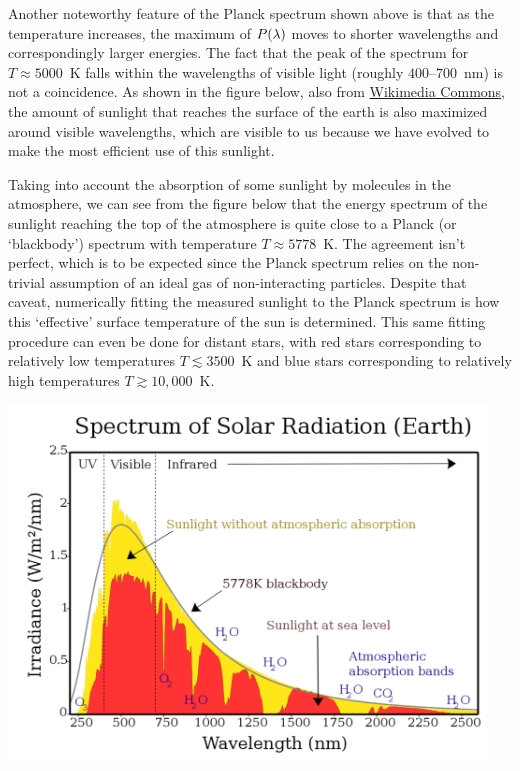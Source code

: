 Another noteworthy feature of the Planck spectrum shown above is that as the temperature increases, the maximum of $P(\lambda)$ moves to shorter wavelengths and correspondingly larger energies.
The fact that the peak of the spectrum for $T \approx 5000$~K falls within the wavelengths of visible light (roughly $400$--$700$~nm) is not a coincidence.
As shown in the figure below, also from \href{https://commons.wikimedia.org/wiki/File:Solar_spectrum_en.svg}{Wikimedia Commons}, the amount of sunlight that reaches the surface of the earth is also maximized around visible wavelengths, which are visible to us because we have evolved to make the most efficient use of this sunlight.

Taking into account the absorption of some sunlight by molecules in the atmosphere, we can see from the figure below that the energy spectrum of the sunlight reaching the top of the atmosphere is quite close to a Planck (or `blackbody') spectrum with temperature $T \approx 5778$~K.
The agreement isn't perfect, which is to be expected since the Planck spectrum relies on the non-trivial assumption of an ideal gas of non-interacting particles.
Despite that caveat, numerically fitting the measured sunlight to the Planck spectrum is how this `effective' surface temperature of the sun is determined.
This same fitting procedure can even be done for distant stars, with red stars corresponding to relatively low temperatures $T \lesssim 3500$~K and blue stars corresponding to relatively high temperatures $T \gtrsim 10{,}000$~K.

\begin{center}\includegraphics[width=0.95\textwidth]{figs/unit08_sun.pdf}\end{center} %

